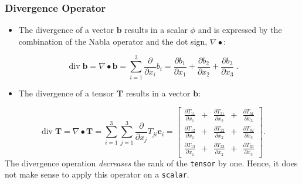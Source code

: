 \subsubsection{Divergence Operator}
%
%
\begin{itemize}
    \item The divergence of a vector $\textbf{b}$ results in a scalar $\phi$
    and is expressed by the combination of the Nabla operator and the dot
    sign, $\nabla \bullet$:
\end{itemize}
%
%
\begin{equation}
 \operatorname{div} \textbf{b} = \nabla \bullet \textbf{b} = \sum_{i=1}^{3} \frac{\partial}{\partial x_i} b_i
=
  \frac{\partial b_1}{\partial x_1} + \frac{\partial b_2}{\partial x_2} + \frac{\partial b_3}{\partial x_3} ~.
  \label{EQUATION::divVector}
\end{equation}
%
%
\begin{itemize}
    \item The divergence of a tensor $\textbf{T}$ results in a vector $\textbf{b}$:
\end{itemize}
%
%
\begin{equation}
  \operatorname{div} \textbf{T} = \nabla \bullet \textbf{T}
=
  \sum_{i=1}^{3}\sum_{j=1}^{3} \frac{\partial}{\partial x_j} T_{ji} \textbf{e}_i
=
  \left[
  \begin{matrix}
   \frac{\partial T_{11}}{\partial x_1} ~ ~ + ~ ~ \frac{\partial T_{21}}{\partial x_2} ~ ~ + ~ ~ \frac{\partial T_{31}}{\partial x_3} \\
   \frac{\partial T_{12}}{\partial x_1} ~ ~ + ~ ~ \frac{\partial T_{22}}{\partial x_2} ~ ~ + ~ ~ \frac{\partial T_{32}}{\partial x_3} \\
   \frac{\partial T_{13}}{\partial x_1} ~ ~ + ~ ~ \frac{\partial T_{23}}{\partial x_2} ~ ~ + ~ ~ \frac{\partial T_{33}}{\partial x_3}
  \end{matrix}
  \right] .
  \label{EQUATION::divTensor}
\end{equation}
%
%
    The divergence operation \textit{decreases} the rank of the \texttt{tensor}
    by one. Hence, it does not make sense to apply this operator on a
    \texttt{scalar}.
%
%
%
%
